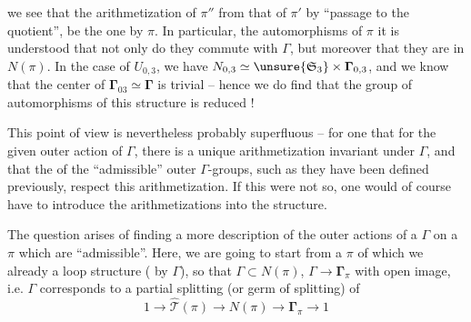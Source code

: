 
we see that the arithmetization of $\pi''$  from that of $\pi'$ by ``passage to the quotient'', be the one  by $\pi$.  In particular,  the  automorphisms of $\pi$ it is understood that  not only do they commute with $\Gamma$, but moreover that they are in $N(\pi)$.  In the case of $U_{0,3}$, we have $N_{0,3}\simeq\unsure{\mathfrak S_3}\times\boldsymbol{\Gamma}_{0,3}$, and we know that the center of $\boldsymbol{\Gamma}_{03}\simeq\boldsymbol{\Gamma}$ is trivial -- hence we do find that the group of automorphisms of this structure is reduced  !

This point of view is nevertheless probably superfluous -- for one  that for the given outer action of $\Gamma$, there is a unique arithmetization invariant under $\Gamma$, and that the   of the ``admissible'' outer $\Gamma$-groups, such as they have been defined previously, respect  this arithmetization. If this were not so, one would of course have to introduce the arithmetizations into the structure.




The question arises of finding a more   description of the outer actions of a $\Gamma$ on a $\pi$ which are ``admissible''.  Here, we are going to start from a $\pi$ of which we already  a loop structure  ( by $\Gamma$), so  that $\Gamma\subset N(\pi)$, $\Gamma\longrightarrow\boldsymbol{\Gamma}_\pi$  with open image,  i.e. $\Gamma$ corresponds to a partial splitting (or germ of splitting) of 
\[
1\longrightarrow\widehat{\mathcal T}(\pi)\longrightarrow N(\pi)\longrightarrow\boldsymbol{\Gamma}_\pi\longrightarrow1
\]

